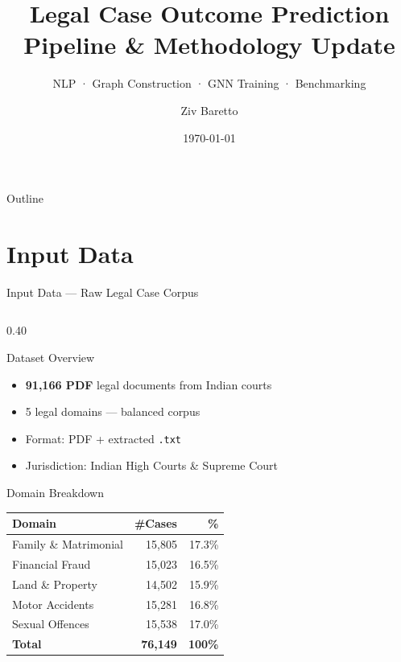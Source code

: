 \documentclass[aspectratio=169, 9pt]{beamer}
\title[Legal Case Outcome GNN]{%
  \textbf{Legal Case Outcome Prediction}\\[4pt]
  \large Pipeline \& Methodology Update}
\subtitle{NLP · Graph Construction · GNN Training · Benchmarking}
\author{Ziv Baretto}
\date{\today}
\begin{document}

\begin{frame}
  \titlepage
\end{frame}

\begin{frame}{Outline}
  \tableofcontents
\end{frame}

\section{Input Data}

\begin{frame}{Input Data — Raw Legal Case Corpus}
  \begin{columns}[T]
    \begin{column}{0.40\textwidth}
      \begin{block}{Dataset Overview}
        \small
        \begin{itemize}\setlength\itemsep{2pt}
          \item \textbf{91,166 PDF} legal documents from Indian courts
          \item 5 legal domains — balanced corpus
          \item Format: PDF + extracted \texttt{.txt}
          \item Jurisdiction: Indian High Courts \& Supreme Court
        \end{itemize}
      \end{block}
      \vspace{6pt}
      \begin{block}{Domain Breakdown}
        \scriptsize\renewcommand{\arraystretch}{1.15}
        \begin{tabular}{lrr}
          \toprule
          \textbf{Domain} & \textbf{\#Cases} & \textbf{\%}\\
          \midrule
          Family \& Matrimonial & 15,805 & 17.3\%\\
          Financial Fraud       & 15,023 & 16.5\%\\
          Land \& Property      & 14,502 & 15.9\%\\
          Motor Accidents       & 15,281 & 16.8\%\\
          Sexual Offences       & 15,538 & 17.0\%\\
          \midrule
          \textbf{Total}        & \textbf{76,149} & \textbf{100\%}\\

\end{tabular}
\end{block}
\end{column}
\end{columns}
\end{frame}
\end{document}
